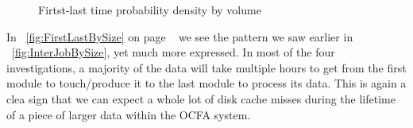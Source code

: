 \begin{figure}
{}
\caption{Firtst-last time probability density by volume}
\label{fig:FirstLastiBySize}
\end{figure}

In ~\ref{fig:FirstLastBySize} on page ~\pageref{fig:FirstLastBySize} we see the pattern we saw earlier in ~\ref{fig:InterJobBySize}, yet much more expressed. In most of the four investigations, a majority of the data will take multiple hours to get from the first module to touch/produce it to the last module to process its data. This is again a clea sign that we can expect a whole lot of disk cache misses during the lifetime of a piece of larger data within the OCFA system.
